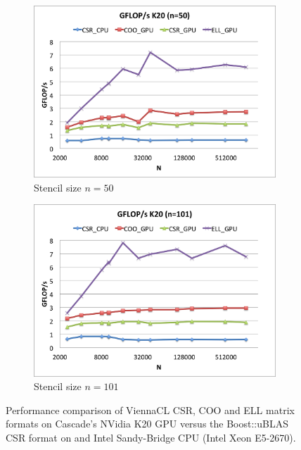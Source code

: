 \documentclass{report}
\begin{document}
\begin{figure}
\begin{subfigure}[t]{0.48\textwidth}
\includegraphics[width=\textwidth]{gpu_content/cascade_spmv/gflops_cascade_k20_n50.png}
\caption{Stencil size $n=50$}
\end{subfigure}
\quad
\begin{subfigure}[t]{0.48\textwidth}
\centering
\includegraphics[width=\textwidth]{gpu_content/cascade_spmv/gflops_cascade_k20_n101.png}
\caption{Stencil size $n=101$}
\end{subfigure}
\caption{Performance comparison of ViennaCL CSR, COO and ELL matrix formats on Cascade's NVidia K20 GPU versus the Boost::uBLAS CSR format on and Intel Sandy-Bridge CPU (Intel Xeon E5-2670).}
\label{fig:gflops_cascade_k20}
\end{figure}
\end{document}
